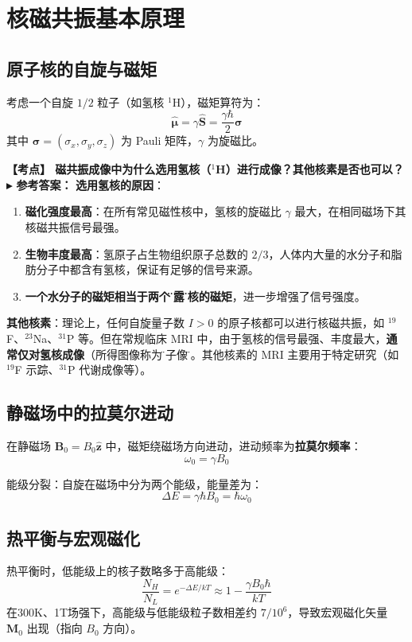 \documentclass[12pt,a4paper]{article}
\newcommand{\boxeq}[1]{\begin{equation}\boxed{#1}\end{equation}}
\newcommand{\exam}[1]{\textbf{\color{blue!70!black}【考点】#1}}
\newcommand{\answer}[1]{\vspace{2pt}\noindent\textbf{\color{teal!80!black}▸ 参考答案：}#1\vspace{4pt}}
\newcommand{\qa}[2]{\exam{#1}\answer{#2}}
\begin{document}
\section{核磁共振基本原理}

\subsection{原子核的自旋与磁矩}
考虑一个自旋 \(1/2\) 粒子（如氢核 \(^1\text{H}\)），磁矩算符为：
\begin{equation}
    \hat{\boldsymbol{\mu}} = \gamma \hat{\mathbf{S}} = \frac{\gamma\hbar}{2} \boldsymbol{\sigma}
\end{equation}
其中 \(\boldsymbol{\sigma}=(\sigma_x, \sigma_y, \sigma_z)\) 为 Pauli 矩阵，\(\gamma\) 为旋磁比。

\qa{
    磁共振成像中为什么选用氢核（$^1$H）进行成像？其他核素是否也可以？
}{
    \textbf{选用氢核的原因}：
    \begin{enumerate}
        \item \textbf{磁化强度最高}：在所有常见磁性核中，氢核的旋磁比 $\gamma$ 最大，在相同磁场下其核磁共振信号最强。
        \item \textbf{生物丰度最高}：氢原子占生物组织原子总数的 $2/3$，人体内大量的水分子和脂肪分子中都含有氢核，保证有足够的信号来源。
        \item \textbf{一个水分子的磁矩相当于两个\"裸露\"轻核的磁矩}，进一步增强了信号强度。
    \end{enumerate}
    \textbf{其他核素}：理论上，任何自旋量子数 $I>0$ 的原子核都可以进行核磁共振，如 $^{19}$F、$^{23}$Na、$^{31}$P 等。但在常规临床 MRI 中，由于氢核的信号最强、丰度最大，\textbf{通常仅对氢核成像}（所得图像称为\"质子像\"）。其他核素的 MRI 主要用于特定研究（如 $^{19}$F 示踪、$^{31}$P 代谢成像等）。
}

\subsection{静磁场中的拉莫尔进动}
在静磁场 \(\mathbf{B}_0 = B_0 \hat{\mathbf{z}}\) 中，磁矩绕磁场方向进动，进动频率为\textbf{拉莫尔频率}：
\boxeq{\omega_0 = \gamma B_0}

能级分裂：自旋在磁场中分为两个能级，能量差为：
\begin{equation}
    \Delta E = \gamma \hbar B_0 = \hbar \omega_0
\end{equation}

\subsection{热平衡与宏观磁化}
热平衡时，低能级上的核子数略多于高能级：
\begin{equation}
    \frac{N_H}{N_L} = e^{-\Delta E/kT} \approx 1 - \frac{\gamma B_0 \hbar}{kT}
\end{equation}
在300K、1T场强下，高能级与低能级粒子数相差约 \(7/10^6\)，导致宏观磁化矢量 \(\mathbf{M}_0\) 出现（指向 \(B_0\) 方向）。
\end{document}
